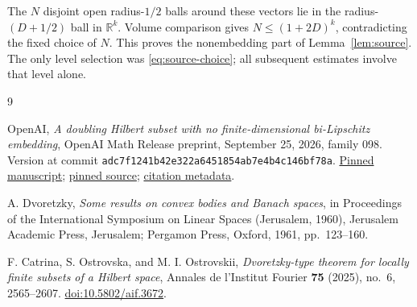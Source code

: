 \documentclass[
  11pt,
]{article}
\theoremstyle{remark}\newtheorem{remark}[theorem]{Remark}
\newcommand{\R}{\mathbb R}\newcommand{\N}{\mathbb N}\newcommand{\Z}{\mathbb Z}
\begin{document}
The $N$ disjoint open radius-$1/2$ balls around these vectors lie in the radius-$(D+1/2)$ ball in $\R^k$. Volume comparison gives $N\le(1+2D)^k$, contradicting the fixed choice of $N$. This proves the nonembedding part of Lemma~\ref{lem:source}. The only level selection was \eqref{eq:source-choice}; all subsequent estimates involve that level alone.

\begin{thebibliography}{9}
\raggedright
{}
OpenAI, \emph{A doubling Hilbert subset with no finite-dimensional bi-Lipschitz embedding}, OpenAI Math Release preprint, September 25, 2026, family 098. Version at commit \texttt{adc7f1241b42e322a6451854ab7e4b4c146bf78a}.
\href{https://github.com/openai/math/blob/adc7f1241b42e322a6451854ab7e4b4c146bf78a/preprints/A-doubling-Hilbert-subset-with-no-finite-dimensional-bi-Lipschitz-embedding-September-25-2026/main.pdf}{Pinned manuscript};
\href{https://github.com/openai/math/blob/adc7f1241b42e322a6451854ab7e4b4c146bf78a/preprints/A-doubling-Hilbert-subset-with-no-finite-dimensional-bi-Lipschitz-embedding-September-25-2026/build/main.tex}{pinned source};
\href{https://github.com/openai/math/blob/adc7f1241b42e322a6451854ab7e4b4c146bf78a/preprints/A-doubling-Hilbert-subset-with-no-finite-dimensional-bi-Lipschitz-embedding-September-25-2026/README.md}{citation metadata}.

A. Dvoretzky, \emph{Some results on convex bodies and Banach spaces}, in Proceedings of the International Symposium on Linear Spaces (Jerusalem, 1960), Jerusalem Academic Press, Jerusalem; Pergamon Press, Oxford, 1961, pp.~123--160.

F. Catrina, S. Ostrovska, and M. I. Ostrovskii, \emph{Dvoretzky-type theorem for locally finite subsets of a Hilbert space}, Annales de l'Institut Fourier \textbf{75} (2025), no.~6, 2565--2607.
\href{https://doi.org/10.5802/aif.3672}{doi:10.5802/aif.3672}.
\end{thebibliography}
\end{document}
